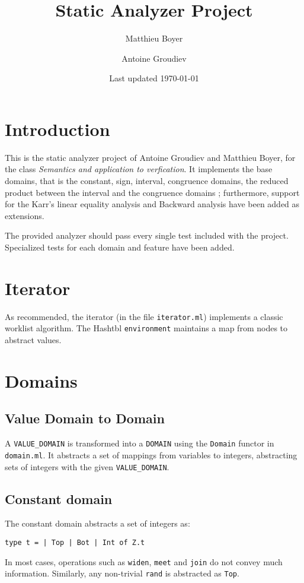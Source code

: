 \documentclass[12pt,a4paper]{article}
\title{\vspace{-5ex} \textbf{Static Analyzer Project}}
\author{Matthieu Boyer\and Antoine Groudiev}
\date{\vspace{-1ex}Last updated \today}
\begin{document}
\maketitle

\section*{Introduction}
This is the static analyzer project of Antoine Groudiev and Matthieu Boyer, for the class \emph{Semantics and application to verfication}. It implements the base domains, that is the constant, sign, interval, congruence domains, the reduced product between the interval and the congruence domains ; furthermore, support for the Karr’s linear equality analysis and Backward analysis have been added as extensions.

The provided analyzer should pass every single test included with the project. Specialized tests for each domain and feature have been added.

\section{Iterator}
As recommended, the iterator (in the file \texttt{iterator.ml}) implements a classic worklist algorithm. The Hashtbl \texttt{environment} maintains a map from nodes to abstract values.

\section{Domains}
\subsection{Value Domain to Domain}
A \texttt{VALUE\_DOMAIN} is transformed into a \texttt{DOMAIN} using the \texttt{Domain} functor in \texttt{domain.ml}. It abstracts a set of mappings from variables to integers, abstracting sets of integers with the given \texttt{VALUE\_DOMAIN}.

\subsection{Constant domain}
The constant domain abstracts a set of integers as:
\begin{center}
    \texttt{type t = | Top | Bot | Int of Z.t}
\end{center}
In most cases, operations such as \texttt{widen}, \texttt{meet} and \texttt{join} do not convey much information. Similarly, any non-trivial \texttt{rand} is abstracted as \texttt{Top}.
\end{document}
